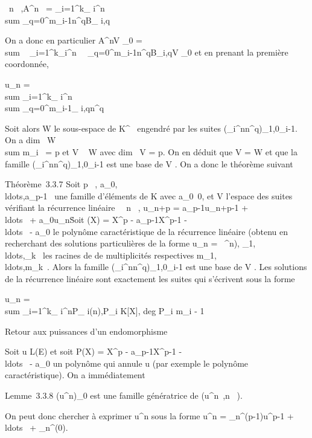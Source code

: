 \documentclass[]{article}
\begin{document}
\forall~n \in {}~,\quad A^n~ =
\sum _i=1^k\lambda_ i^n~
\\sum
_q=0^m_i-1n^qB_ i,q

On a donc en particulier A^nV _0
= \\sum ~
_i=1^k\lambda_i^n\
\sum ~
_q=0^m_i-1n^qB_i,qV
_0 et en prenant la première coordonnée,

u_n = \\sum
_i=1^k\lambda_ i^n \\sum
_q=0^m_i-1\alpha_ i,qn^q

Soit alors W le sous-espace de K^~ engendré par les suites
(\lambda_i^nn^q)_1\leqi\leqk,0\leqq\leqm_i-1.
On a dim~ W
\leq\\sum  m_i~ = p
et V \subset~ W avec dim~ V = p. On en déduit que V =
W et que la famille
(\lambda_i^nn^q)_1\leqi\leqk,0\leqq\leqm_i-1
est une base de V . On a donc le théorème suivant

Théorème~3.3.7 Soit p \in {}~,
a_0,\\ldots,a_p-1~
une famille d'éléments de K avec
a_0\neq~0, et V l'espace des suites
vérifiant la récurrence linéaire \forall~~n \in {}~,
u_n+p = a_p-1u_n+p-1 +
\\ldots~ +
a_0u_n\. Soit \chi(X) = X^p -
a_p-1X^p-1
-\\ldots~ -
a_0 le polynôme caractéristique de la récurrence linéaire
(obtenu en recherchant des solutions particulières de la forme
u_n = \lambda~^n),
\lambda_1,\\ldots,\lambda_k~
les racines de \chi de multiplicités respectives
m_1,\\ldots,m_k~.
Alors la famille
(\lambda_i^nn^q)_1\leqi\leqk,0\leqq\leqm_i-1
est une base de V . Les solutions de la récurrence linéaire sont
exactement les suites qui s'écrivent sous la forme

u_n = \\sum
_i=1^k\lambda_ i^nP_
i(n),\quad P_i \in K[X], deg P_i \leq
m_i - 1

Retour aux puissances d'un endomorphisme

Soit u \in L(E) et soit P(X) = X^p -
a_p-1X^p-1
-\\ldots~ -
a_0 un polynôme qui annule u (par exemple le polynôme
caractéristique). On a immédiatement

Lemme~3.3.8 (u^n)_0\leqn{} est une famille
génératrice de
\mathrmVect(u^n~,n
\in {}~).

On peut donc chercher à exprimer u^n sous la forme
u^n = \alpha_n^(p-1)u^p-1 +
\\ldots~ +
\alpha_n^(0)\mathrmId.
\end{document}
